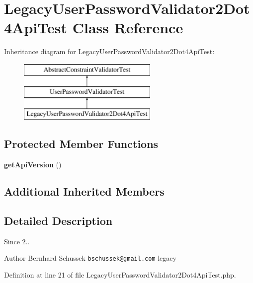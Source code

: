 \section{Legacy\+User\+Password\+Validator2\+Dot4\+Api\+Test Class Reference}
\label{class_symfony_1_1_component_1_1_security_1_1_core_1_1_tests_1_1_validator_1_1_constraints_1_1_led191d8befd908cc0161ee88d75c8ae9b}
Inheritance diagram for Legacy\+User\+Password\+Validator2\+Dot4\+Api\+Test\+:\begin{figure}[H]
\begin{center}
\leavevmode
\includegraphics[height=3.000000cm]{class_symfony_1_1_component_1_1_security_1_1_core_1_1_tests_1_1_validator_1_1_constraints_1_1_led191d8befd908cc0161ee88d75c8ae9b}
\end{center}
\end{figure}
\subsection*{Protected Member Functions}
\begin{DoxyCompactItemize}
\item 
{\bf get\+Api\+Version} ()
\end{DoxyCompactItemize}
\subsection*{Additional Inherited Members}


\subsection{Detailed Description}
\begin{DoxySince}{Since}
2.. 
\end{DoxySince}
\begin{DoxyAuthor}{Author}
Bernhard Schussek {\tt bschussek@gmail.\+com}  legacy 
\end{DoxyAuthor}


Definition at line 21 of file Legacy\+User\+Password\+Validator2\+Dot4\+Api\+Test.\+php.



